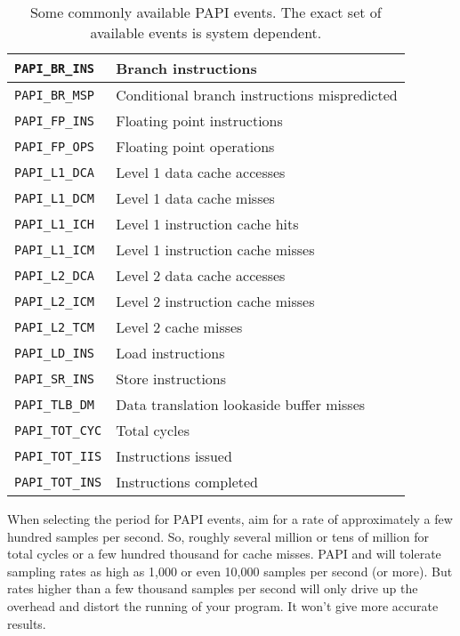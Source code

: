 \begin{table}
\begin{center}
\begin{tabular}{|l|l|}
\hline
\verb|PAPI_BR_INS| & Branch instructions \\
\hline
\verb|PAPI_BR_MSP| & Conditional branch instructions mispredicted \\
\hline
\verb|PAPI_FP_INS| & Floating point instructions \\
\hline
\verb|PAPI_FP_OPS| & Floating point operations \\
\hline
\verb|PAPI_L1_DCA| & Level 1 data cache accesses \\
\hline
\verb|PAPI_L1_DCM| & Level 1 data cache misses \\
\hline
\verb|PAPI_L1_ICH| & Level 1 instruction cache hits \\
\hline
\verb|PAPI_L1_ICM| & Level 1 instruction cache misses \\
\hline
\verb|PAPI_L2_DCA| & Level 2 data cache accesses \\
\hline
\verb|PAPI_L2_ICM| & Level 2 instruction cache misses \\
\hline
\verb|PAPI_L2_TCM| & Level 2 cache misses \\
\hline
\verb|PAPI_LD_INS| & Load instructions \\
\hline
\verb|PAPI_SR_INS| & Store instructions \\
\hline
\verb|PAPI_TLB_DM| & Data translation lookaside buffer misses \\
\hline
\verb|PAPI_TOT_CYC| & Total cycles \\
\hline
\verb|PAPI_TOT_IIS| & Instructions issued \\
\hline
\verb|PAPI_TOT_INS| & Instructions completed \\
\hline
\end{tabular}
\end{center}
\caption{Some commonly available PAPI events.
The exact set of available events is system dependent.}
\label{tab:papi-events}
\end{table}

When selecting the period for PAPI events, aim for a rate of
approximately a few hundred samples per second.  So, roughly several
million or tens of million for total cycles or a few hundred thousand
for cache misses.  PAPI and \hpcrun{} will tolerate sampling rates as
high as 1,000 or even 10,000 samples per second (or more).  But rates
higher than a few thousand samples per second will only drive up the
overhead and distort the running of your program.  It won't give more
accurate results.

